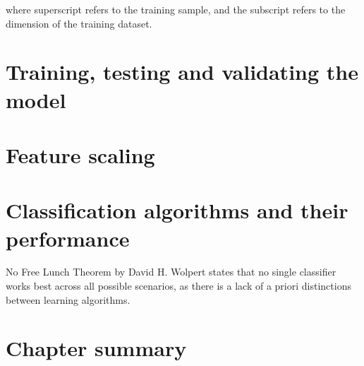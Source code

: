 where superscript refers to the training sample, and the subscript refers to the dimension of the training dataset.


\section{Training, testing and validating the model} \label{sec:train_test_validate_model}

\section{Feature scaling} \label{sec:feature_scaling}

\section{Classification algorithms and their performance} \label{sec:classification_algorithms_performance}

No Free Lunch Theorem by David H. Wolpert states that no single classifier works best across all possible scenarios\cite{Wolpert1996}, as there is a lack of a priori distinctions between learning algorithms.

\section{Chapter summary} \label{ml_workflow_summary}